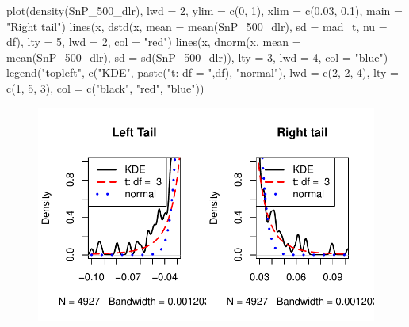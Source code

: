 \documentclass[
  letterpaper,
  DIV=11,
  numbers=noendperiod]{scrartcl}
\newenvironment{Shaded}{\begin{snugshade}}{\end{snugshade}}
\newcommand{\AttributeTok}[1]{\textcolor[rgb]{0.40,0.45,0.13}{#1}}
\newcommand{\DecValTok}[1]{\textcolor[rgb]{0.68,0.00,0.00}{#1}}
\newcommand{\FloatTok}[1]{\textcolor[rgb]{0.68,0.00,0.00}{#1}}
\newcommand{\FunctionTok}[1]{\textcolor[rgb]{0.28,0.35,0.67}{#1}}
\newcommand{\NormalTok}[1]{\textcolor[rgb]{0.00,0.23,0.31}{#1}}
\newcommand{\StringTok}[1]{\textcolor[rgb]{0.13,0.47,0.30}{#1}}
\begin{document}
\begin{Shaded}
\begin{Highlighting}[]
\FunctionTok{plot}\NormalTok{(}\FunctionTok{density}\NormalTok{(SnP\_500\_dlr), }\AttributeTok{lwd =} \DecValTok{2}\NormalTok{, }\AttributeTok{ylim =} \FunctionTok{c}\NormalTok{(}\DecValTok{0}\NormalTok{, }\DecValTok{1}\NormalTok{), }\AttributeTok{xlim =} \FunctionTok{c}\NormalTok{(}\FloatTok{0.03}\NormalTok{, }\FloatTok{0.1}\NormalTok{),}
     \AttributeTok{main =} \StringTok{"Right tail"}\NormalTok{)}
\FunctionTok{lines}\NormalTok{(x, }\FunctionTok{dstd}\NormalTok{(x, }\AttributeTok{mean =} \FunctionTok{mean}\NormalTok{(SnP\_500\_dlr), }\AttributeTok{sd =}\NormalTok{ mad\_t, }\AttributeTok{nu =}\NormalTok{ df),}
 \AttributeTok{lty =} \DecValTok{5}\NormalTok{, }\AttributeTok{lwd =} \DecValTok{2}\NormalTok{, }\AttributeTok{col =} \StringTok{"red"}\NormalTok{)}
\FunctionTok{lines}\NormalTok{(x, }\FunctionTok{dnorm}\NormalTok{(x, }\AttributeTok{mean =} \FunctionTok{mean}\NormalTok{(SnP\_500\_dlr), }\AttributeTok{sd =} \FunctionTok{sd}\NormalTok{(SnP\_500\_dlr)),}
 \AttributeTok{lty =} \DecValTok{3}\NormalTok{, }\AttributeTok{lwd =} \DecValTok{4}\NormalTok{, }\AttributeTok{col =} \StringTok{"blue"}\NormalTok{)}
\FunctionTok{legend}\NormalTok{(}\StringTok{"topleft"}\NormalTok{, }\FunctionTok{c}\NormalTok{(}\StringTok{"KDE"}\NormalTok{, }\FunctionTok{paste}\NormalTok{(}\StringTok{"t: df = "}\NormalTok{,df), }\StringTok{"normal"}\NormalTok{),}
 \AttributeTok{lwd =} \FunctionTok{c}\NormalTok{(}\DecValTok{2}\NormalTok{, }\DecValTok{2}\NormalTok{, }\DecValTok{4}\NormalTok{), }\AttributeTok{lty =} \FunctionTok{c}\NormalTok{(}\DecValTok{1}\NormalTok{, }\DecValTok{5}\NormalTok{, }\DecValTok{3}\NormalTok{),}
 \AttributeTok{col =} \FunctionTok{c}\NormalTok{(}\StringTok{"black"}\NormalTok{, }\StringTok{"red"}\NormalTok{, }\StringTok{"blue"}\NormalTok{))}
\end{Highlighting}
\end{Shaded}

\begin{figure}[H]

{\centering \includegraphics{homework_1_files/figure-pdf/unnamed-chunk-20-1.pdf}

}

\end{figure}
\end{document}
